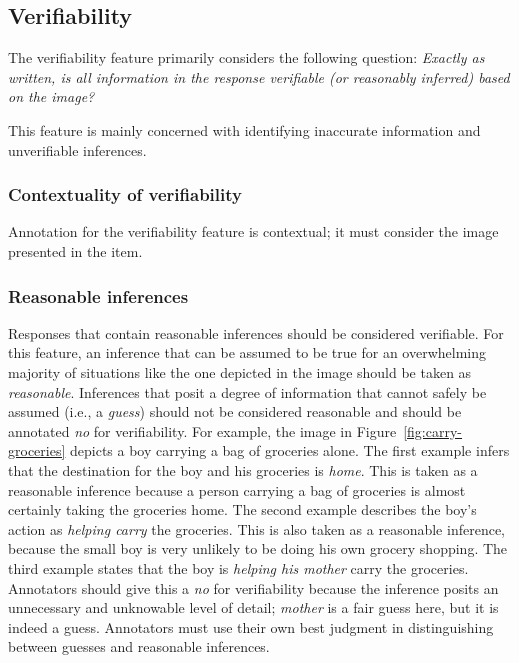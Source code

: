 \documentclass[12pt]{article}
\begin{document}
\subsection{Verifiability} \label{subsec:verifiability}

The verifiability feature primarily considers the following question: \textit{Exactly as written, is all information in the response verifiable (or reasonably inferred) based on the image?}

This feature is mainly concerned with identifying inaccurate information and unverifiable inferences. 

\subsubsection{Contextuality of verifiability} Annotation for the verifiability feature is contextual; it must consider the image presented in the item. 

\subsubsection{Reasonable inferences} Responses that contain reasonable inferences should be considered verifiable. For this feature, an inference that can be assumed to be true for an overwhelming majority of situations like the one depicted in the image should be taken as \textit{reasonable}. Inferences that posit a degree of information that cannot safely be assumed (i.e., a \textit{guess}) should not be considered reasonable and should be annotated \textit{no} for verifiability. For example, the image in Figure~\ref{fig:carry-groceries} depicts a boy carrying a bag of groceries alone. The first example infers that the destination for the boy and his groceries is \textit{home}. This is taken as a reasonable inference because a person carrying a bag of groceries is almost certainly taking the groceries home. The second example describes the boy's action as \textit{helping carry} the groceries. This is also taken as a reasonable inference, because the small boy is very unlikely to be doing his own grocery shopping. The third example states that the boy is \textit{helping his mother} carry the groceries. Annotators should give this a \textit{no} for verifiability because the inference posits an unnecessary and unknowable level of detail; \textit{mother} is a fair guess here, but it is indeed a guess. Annotators must use their own best judgment in distinguishing between guesses and reasonable inferences.
\end{document}
